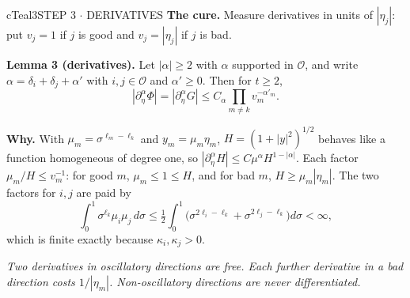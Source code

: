 \documentclass[10pt]{article}
\newcommand{\cO}{\mathcal{O}}
\newcommand{\lab}[2]{\textbf{\color{#1}#2}}
\newcommand{\remk}[2]{{\color{#1}\itshape #2}}
\begin{document}
\begin{minipage}[t][49.0cm][t]{0.322\textwidth}
\begin{panel}{cTeal}{3}{STEP 3 $\cdot$ DERIVATIVES}
\lab{cTeal}{The cure.} Measure derivatives in units of $|\eta_j|$: put $v_j=1$ if $j$ is good
and $v_j=|\eta_j|$ if $j$ is bad.
\begin{keybox}[cTeal]
\lab{cTeal}{Lemma 3 (derivatives).} Let $|\alpha|\ge2$ with $\alpha$ supported in $\cO$, and
write $\alpha=\delta_i+\delta_j+\alpha'$ with $i,j\in\cO$ and $\alpha'\ge0$. Then for $t\ge2$,
\[
|\partial_\eta^\alpha\Phi|=|\partial_\eta^\alpha G|\le C_\alpha\prod_{m\ne k}v_m^{-\alpha'_m}.
\]
\end{keybox}
\lab{cTeal}{Why.} With $\mu_m=\sigma^{\ell_m-\ell_k}$ and $y_m=\mu_m\eta_m$, $H=(1+|y|^2)^{1/2}$
behaves like a function homogeneous of degree one, so
$|\partial_\eta^\alpha H|\le C\mu^\alpha H^{1-|\alpha|}$. Each factor $\mu_m/H\le v_m^{-1}$:
for good $m$, $\mu_m\le1\le H$, and for bad $m$, $H\ge\mu_m|\eta_m|$. The two factors for
$i,j$ are paid by
\[
\int_0^1\sigma^{\ell_k}\mu_i\mu_j\,d\sigma\le\tfrac12\int_0^1\big(\sigma^{2\ell_i-\ell_k}+\sigma^{2\ell_j-\ell_k}\big)d\sigma<\infty ,
\]
which is finite exactly because $\kappa_i,\kappa_j>0$.

\remk{cTeal}{Two derivatives in oscillatory directions are free. Each further derivative in a
bad direction costs $1/|\eta_m|$. Non-oscillatory directions are never differentiated.}
\end{panel}

\end{minipage}\hfill
\end{document}
